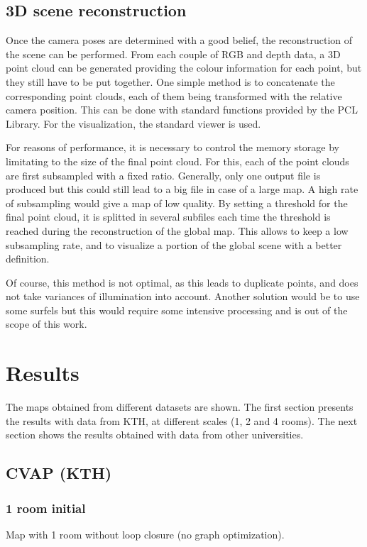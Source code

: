 \documentclass[a4paper,11pt]{kth-mag}
\begin{document}
\section{3D scene reconstruction}

Once the camera poses are determined with a good belief, the reconstruction of the scene can be performed. From each couple of RGB and depth data, a 3D point cloud can be generated providing the colour information for each point, but they still have to be put together. One simple method is to concatenate the corresponding point clouds, each of them being transformed with the relative camera position. This can be done with standard functions provided by the PCL Library. For the visualization, the standard viewer is used.

For reasons of performance, it is necessary to control the memory storage by limitating to the size of the final point cloud. For this, each of the point clouds are first subsampled with a fixed ratio. Generally, only one output file is produced but this could still lead to a big file in case of a large map. A high rate of subsampling would give a map of low quality. By setting a threshold for the final point cloud, it is splitted in several subfiles each time the threshold is reached during the reconstruction of the global map. This allows to keep a low subsampling rate, and to visualize a portion of the global scene with a better definition.

Of course, this method is not optimal, as this leads to duplicate points, and does not take variances of illumination into account. Another solution would be to use some surfels \cite{IntelRGBD2010} but this would require some intensive processing and is out of the scope of this work.

\chapter{Results}

The maps obtained from different datasets are shown. The first section presents the results with data from KTH, at different scales (1, 2 and 4 rooms). The next section shows the results obtained with data from other universities.

\section{CVAP (KTH)}

\subsection{1 room initial}
Map with 1 room without loop closure (no graph optimization).
\end{document}
